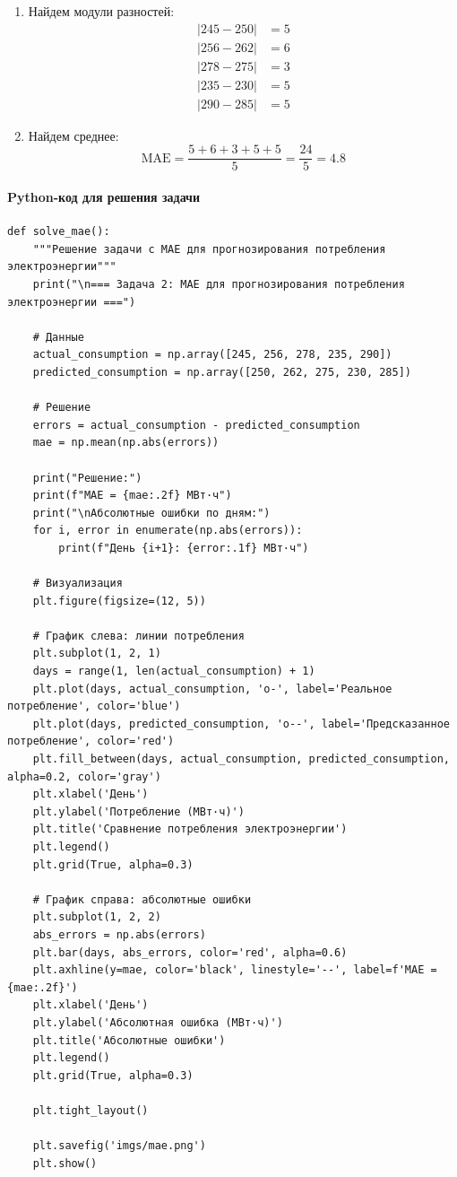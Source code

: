 \begin{enumerate}
    \item {Найдем модули разностей:}
          \[
              \begin{aligned}
                  |245 - 250| & = 5 \\
                  |256 - 262| & = 6 \\
                  |278 - 275| & = 3 \\
                  |235 - 230| & = 5 \\
                  |290 - 285| & = 5
              \end{aligned}
          \]

    \item {Найдем среднее:}
          \[
              \text{MAE} = \frac{5 + 6 + 3 + 5 + 5}{5} = \frac{24}{5} = 4.8
          \]
\end{enumerate}

\paragraph*{Python-код для решения задачи}

\begin{verbatim}
def solve_mae():
    """Решение задачи с MAE для прогнозирования потребления электроэнергии"""
    print("\n=== Задача 2: MAE для прогнозирования потребления электроэнергии ===")
    
    # Данные
    actual_consumption = np.array([245, 256, 278, 235, 290])
    predicted_consumption = np.array([250, 262, 275, 230, 285])
    
    # Решение
    errors = actual_consumption - predicted_consumption
    mae = np.mean(np.abs(errors))
    
    print("Решение:")
    print(f"MAE = {mae:.2f} МВт·ч")
    print("\nАбсолютные ошибки по дням:")
    for i, error in enumerate(np.abs(errors)):
        print(f"День {i+1}: {error:.1f} МВт·ч")
    
    # Визуализация
    plt.figure(figsize=(12, 5))
    
    # График слева: линии потребления
    plt.subplot(1, 2, 1)
    days = range(1, len(actual_consumption) + 1)
    plt.plot(days, actual_consumption, 'o-', label='Реальное потребление', color='blue')
    plt.plot(days, predicted_consumption, 'o--', label='Предсказанное потребление', color='red')
    plt.fill_between(days, actual_consumption, predicted_consumption, alpha=0.2, color='gray')
    plt.xlabel('День')
    plt.ylabel('Потребление (МВт·ч)')
    plt.title('Сравнение потребления электроэнергии')
    plt.legend()
    plt.grid(True, alpha=0.3)
    
    # График справа: абсолютные ошибки
    plt.subplot(1, 2, 2)
    abs_errors = np.abs(errors)
    plt.bar(days, abs_errors, color='red', alpha=0.6)
    plt.axhline(y=mae, color='black', linestyle='--', label=f'MAE = {mae:.2f}')
    plt.xlabel('День')
    plt.ylabel('Абсолютная ошибка (МВт·ч)')
    plt.title('Абсолютные ошибки')
    plt.legend()
    plt.grid(True, alpha=0.3)
    
    plt.tight_layout()
    
    plt.savefig('imgs/mae.png')
    plt.show()
\end{verbatim}
